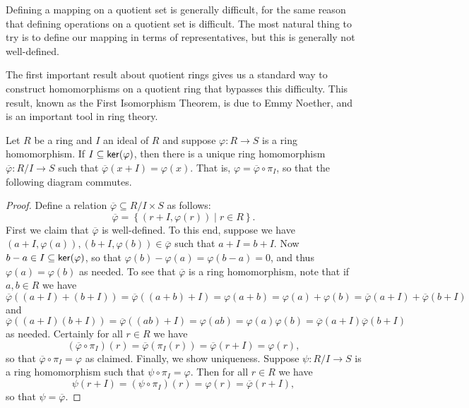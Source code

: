 Defining a mapping on a quotient set is generally difficult, for the same reason that defining operations on a quotient set is difficult.
The most natural thing to try is to define our mapping in terms of representatives, but this is generally not well-defined.

The first important result about quotient rings gives us a standard way to construct homomorphisms on a quotient ring that bypasses this difficulty.
This result, known as the First Isomorphism Theorem, is due to Emmy Noether, and is an important tool in ring theory.

\begin{prop} \label{prop:fit}
Let \(R\) be a ring and \(I\) an ideal of \(R\) and suppose \(\varphi : R \rightarrow S\) is a ring homomorphism.
If \(I \subseteq  \mathsf{ker}(\varphi) \), then there is a unique ring homomorphism \(\overline{\varphi} : R/I \rightarrow S\) such that \(\overline{\varphi}(x + I) = \varphi(x)\).
That is, \(\varphi = \overline{\varphi} \circ \pi_I\), so that the following diagram commutes.
\begin{center}
\end{center}
\end{prop}

\begin{proof}
Define a relation \(\overline{\varphi} \subseteq R/I \times S\) as follows: \[ \overline{\varphi} = \left\{ (r+I, \varphi(r)) \mid r \in R \right\}. \]
First we claim that \(\overline{\varphi}\) is well-defined.
To this end, suppose we have \((a + I, \varphi(a)), (b + I, \varphi(b)) \in \overline{\varphi}\) such that \(a + I = b + I\).
Now \(b - a \in I \subseteq  \mathsf{ker}(\varphi) \), so that \(\varphi(b) - \varphi(a) = \varphi(b - a) = 0\), and thus \(\varphi(a) = \varphi(b)\) as needed.
To see that \(\overline{\varphi}\) is a ring homomorphism, note that if \(a,b \in R\) we have \[ \overline{\varphi}\left((a+I)+(b+I)\right) = \overline{\varphi}\left((a+b)+I\right) = \varphi(a+b) = \varphi(a) + \varphi(b) = \overline{\varphi}(a+I) + \overline{\varphi}(b+I) \] and \[ \overline{\varphi}((a+I)(b+I)) = \overline{\varphi}((ab)+I) = \varphi(ab) = \varphi(a) \varphi(b) = \overline{\varphi}(a+I) \overline{\varphi}(b+I) \] as needed.
Certainly for all \(r \in R\) we have \[ (\overline{\varphi} \circ \pi_I)(r) = \overline{\varphi}(\pi_I(r)) = \overline{\varphi}(r+I) = \varphi(r), \] so that \(\overline{\varphi} \circ \pi_I = \varphi\) as claimed.
Finally, we show uniqueness.
Suppose \(\psi : R/I \rightarrow S\) is a ring homomorphism such that \(\psi \circ \pi_I = \varphi\).
Then for all \(r \in R\) we have \[ \psi(r+I) = (\psi \circ \pi_I)(r) = \varphi(r) = \overline{\varphi}(r+I), \] so that \(\psi = \overline{\varphi}\).
\end{proof}

